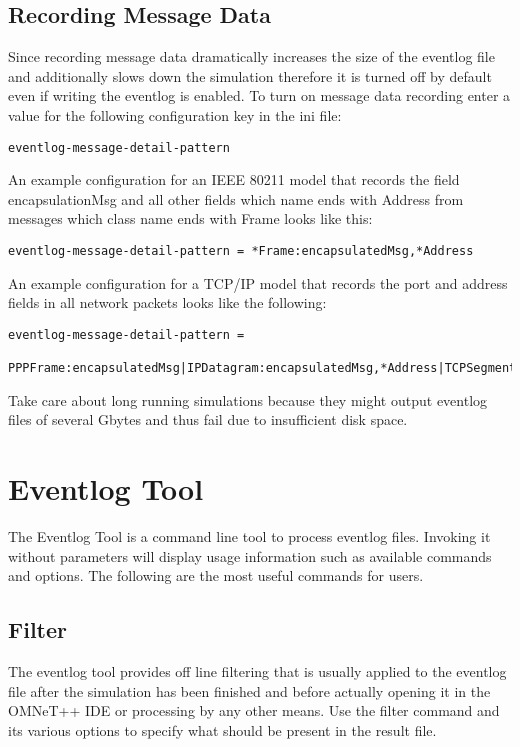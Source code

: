 \subsection{Recording Message Data}
Since recording message data dramatically increases the size of the
eventlog file and additionally slows down the simulation therefore it
is turned off by default even if writing the eventlog is enabled. To
turn on message data recording enter a value for the following
configuration key in the ini file:
\begin{verbatim}
eventlog-message-detail-pattern
\end{verbatim}
An example configuration for an IEEE 80211 model that records the
field encapsulationMsg and all other fields which name ends with
Address from messages which class name ends with Frame looks like
this:
\begin{verbatim}
eventlog-message-detail-pattern = *Frame:encapsulatedMsg,*Address
\end{verbatim}
An example configuration for a TCP/IP model that records the port and
address fields in all network packets looks like the following:
\begin{verbatim}
eventlog-message-detail-pattern =
 PPPFrame:encapsulatedMsg|IPDatagram:encapsulatedMsg,*Address|TCPSegment:*Port
\end{verbatim}
\begin{note}
Take care about long running simulations because they might output
eventlog files of several Gbytes and thus fail due to insufficient
disk space.
\end{note}

\section{Eventlog Tool}
The Eventlog Tool is a command line tool to process eventlog
files. Invoking it without parameters will display usage information
such as available commands and options. The following are the most
useful commands for users.

\subsection{Filter}
The eventlog tool provides off line filtering that is usually applied
to the eventlog file after the simulation has been finished and before
actually opening it in the OMNeT++ IDE or processing by any other
means. Use the filter command and its various options to specify what
should be present in the result file.


